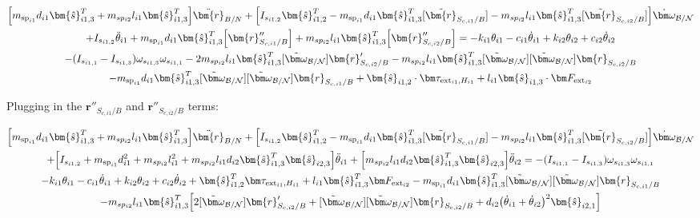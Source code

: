 \begin{multline}
	\Big[m_{\text{sp}_{i1}} d_{i1} \bm{\hat{s}}_{i1,3}^T + m_{sp_{i2}} l_{i1} \bm{\hat{s}}_{i1,3}^T \Big] \ddot{\bm{r}}_{B/N} + \Big[I_{s_{i1,2}} \bm{\hat{s}}_{i1,2}^T - m_{\text{sp}_{i1}} d_{i1} \bm{\hat{s}}_{i1,3}^T [\tilde{\bm{r}}_{S_{c,i1}/B}] - m_{sp_{i2}} l_{i1} \bm{\hat{s}}_{i1,3}^T [\tilde{\bm{r}}_{S_{c,i2}/B}] \Big] \dot{\bm \omega}_{\cal{B/N}} \\
	+ I_{s_{i1,2}} \ddot{\theta}_{i1} + m_{\text{sp}_{i1}} d_{i1} \bm{\hat{s}}_{i1,3}^T \Big[ \bm{r}''_{S_{c,i1}/B}
	\Big] + m_{sp_{i2}} l_{i1} \bm{\hat{s}}_{i1,3}^T \Big[ \bm{r}''_{S_{c,i2}/B}\Big]
	= -k_{i1} \theta_{i1} - c_{i1} \dot{\theta}_{i1} + k_{i2} \theta_{i2} + c_{i2} \dot{\theta}_{i2} \\
	- (I_{s_{i1,1}} - I_{s_{i1,3}}) \omega_{s_{i1,3}} \omega_{s_{i1,1}}
	- 2 m_{sp_{i2}} l_{i1} \bm{\hat{s}}_{i1,3}^T [\tilde{\bm\omega}_{\cal B/N}] \bm{r}'_{S_{c,i2}/B}
	- m_{sp_{i2}} l_{i1} \bm{\hat{s}}_{i1,3}^T [\tilde{\bm\omega}_{\cal B/N}] [\tilde{\bm\omega}_{\cal B/N}] \bm{r}_{S_{c,i2}/B}\\
	- m_{\text{sp}_{i1}} d_{i1} \bm{\hat{s}}_{i1,3}^T [\tilde{\bm\omega}_{\cal B/N}] [\tilde{\bm\omega}_{\cal B/N}] \bm{r}_{S_{c,i1}/B}
	+ \bm{\hat{s}}_{i1,2} \cdot \bm \tau_{\text{ext}_{i1},H_{i1}}
	+ l_{i1} \bm{\hat{s}}_{i1,3} \cdot \bm F_{\text{ext}_{i2}}
\end{multline}

Plugging in the $\bm{r}''_{S_{c,i1}/B}$ and $\bm{r}''_{S_{c,i2}/B}$ terms:

\begin{multline}
	\Big[m_{\text{sp}_{i1}} d_{i1} \bm{\hat{s}}_{i1,3}^T + m_{sp_{i2}} l_{i1} \bm{\hat{s}}_{i1,3}^T \Big] \ddot{\bm{r}}_{B/N} + \Big[I_{s_{i1,2}} \bm{\hat{s}}_{i1,2}^T - m_{\text{sp}_{i1}} d_{i1} \bm{\hat{s}}_{i1,3}^T [\tilde{\bm{r}}_{S_{c,i1}/B}] - m_{sp_{i2}} l_{i1} \bm{\hat{s}}_{i1,3}^T [\tilde{\bm{r}}_{S_{c,i2}/B}] \Big] \dot{\bm \omega}_{\cal{B/N}} \\
	+ \Big[I_{s_{i1,2}} + m_{\text{sp}_{i1}} d_{i1}^2 + m_{sp_{i2}} l_{i1}^2 + m_{sp_{i2}} l_{i1} d_{i2} \bm{\hat{s}}_{i1,3}^T \bm{\hat{s}}_{i2,3} \Big] \ddot{\theta}_{i1} + \Big[m_{sp_{i2}} l_{i1} d_{i2} \bm{\hat{s}}_{i1,3}^T \bm{\hat{s}}_{i2,3} \Big]\ddot{\theta}_{i2}
	= - (I_{s_{i1,1}} - I_{s_{i1,3}}) \omega_{s_{i1,3}} \omega_{s_{i1,1}}\\ -k_{i1} \theta_{i1} - c_{i1} \dot{\theta}_{i1}
	+ k_{i2} \theta_{i2} + c_{i2} \dot{\theta}_{i2} + \bm{\hat{s}}_{i1,2}^T \bm \tau_{\text{ext}_{i1},H_{i1}}
	+ l_{i1} \bm{\hat{s}}_{i1,3}^T \bm F_{\text{ext}_{i2}}
	- m_{\text{sp}_{i1}} d_{i1} \bm{\hat{s}}_{i1,3}^T [\tilde{\bm\omega}_{\cal B/N}] [\tilde{\bm\omega}_{\cal B/N}] \bm{r}_{S_{c,i1}/B}\\
	- m_{sp_{i2}} l_{i1} \bm{\hat{s}}_{i1,3}^T\Big[ 2 [\tilde{\bm\omega}_{\cal B/N}] \bm{r}'_{S_{c,i2}/B} + [\tilde{\bm\omega}_{\cal B/N}] [\tilde{\bm\omega}_{\cal B/N}] \bm{r}_{S_{c,i2}/B} + d_{i2} \big(\dot{\theta}_{i1} + \dot{\theta}_{i2}\big)^2 \bm{\hat{s}}_{i2,1}\Big]
\end{multline}

